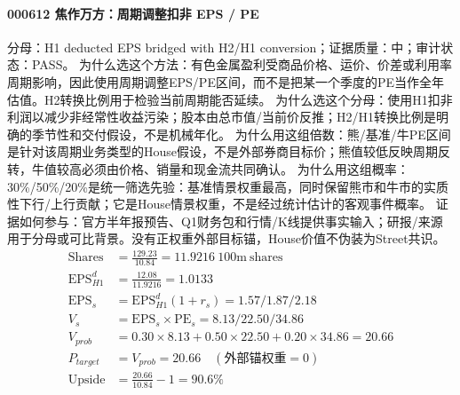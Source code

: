 \paragraph{000612 焦作万方：周期调整扣非 EPS / PE}
分母：H1 deducted EPS bridged with H2/H1 conversion；证据质量：中；审计状态：PASS。
为什么选这个方法：有色金属盈利受商品价格、运价、价差或利用率周期影响，因此使用周期调整EPS/PE区间，而不是把某一个季度的PE当作全年估值。H2转换比例用于检验当前周期能否延续。
为什么选这个分母：使用H1扣非利润以减少非经常性收益污染；股本由总市值/当前价反推；H2/H1转换比例是明确的季节性和交付假设，不是机械年化。
为什么用这组倍数：熊/基准/牛PE区间是针对该周期业务类型的House假设，不是外部券商目标价；熊值较低反映周期反转，牛值较高必须由价格、销量和现金流共同确认。
为什么用这组概率：30\%/50\%/20\%是统一筛选先验：基准情景权重最高，同时保留熊市和牛市的实质性下行/上行贡献；它是House情景权重，不是经过统计估计的客观事件概率。
证据如何参与：官方半年报预告、Q1财务包和行情/K线提供事实输入；研报/来源用于分母或可比背景。没有正权重外部目标锚，House价值不伪装为Street共识。
\begin{align*}
\mathrm{Shares} &= \frac{129.23}{10.84}=11.9216\ \mathrm{100m\ shares}\\
\mathrm{EPS}_{H1}^d &= \frac{12.08}{11.9216}=1.0133\\
\mathrm{EPS}_s &= \mathrm{EPS}_{H1}^d(1+r_s)=1.57/1.87/2.18\\
V_s &= \mathrm{EPS}_s\times \mathrm{PE}_s=8.13/22.50/34.86\\
V_{prob} &= 0.30\times 8.13+0.50\times 22.50+0.20\times 34.86=20.66\\
P_{target} &= V_{prob}=20.66\quad(\text{外部锚权重}=0)\\
\mathrm{Upside} &= \frac{20.66}{10.84}-1=90.6\%\\
\end{align*}

